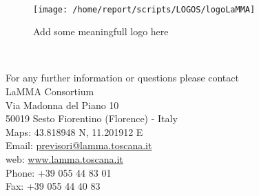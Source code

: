 
\clearpage

\begin{center}
\HRule \\[0.4cm]
\begin{figure}[htbp]
\centering
{\texttt{[image: /home/report/scripts/LOGOS/logoLaMMA]}}
\caption{Add some meaningfull logo here}
\end{figure}
\HRule \\[0.4cm]
\end{center}

\vspace{5.55cm}
\begin{flushright}
\large{For any further information or questions please contact
\\LaMMA Consortium
\\Via Madonna del Piano 10
\\50019 Sesto Fiorentino (Florence) - Italy
\\Maps: 43.818948 N, 11.201912 E
\\Email: \href{mailto:previsori@lamma.toscana.it}{previsori@lamma.toscana.it}
\\web: \href{www.lamma.toscana.it}{www.lamma.toscana.it}
\\Phone: +39 055 44 83 01
\\Fax: +39 055 44 40 83}
\end{flushright}




